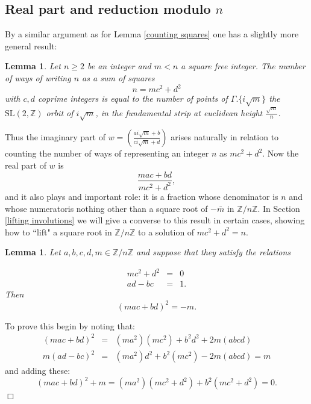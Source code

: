 \documentclass[12pt,a4paper]{amsart}
\newtheorem{lem}[thm]{Lemma}
\def\ZZ{\mathbb{Z}}
\def\sl2{\mathrm{SL}(2, \ZZ)}
\begin{document}
\subsection{Real part and reduction modulo $n$}
\label{real part}

By a similar argument as for Lemma \ref{counting squares}
one has a slightly more general result:

\begin{lem} \label{counting quadratic form}
Let $n\geq2$ be an integer and $m < n$ a square free integer.
The number of  ways of writing $n$  as a  sum of squares
$$n = mc^2 + d^2$$
with $c,d$ coprime integers
is equal to the number of points
of $\Gamma.\{i\sqrt m\}  $
the $\sl2$  orbit of $i\sqrt m$,
in the fundamental strip at euclidean height $\frac{\sqrt m}{n}$.
\end{lem}
\noindent
Thus the imaginary part of
$w = \left (\frac{ai\sqrt{m} +b}{ci\sqrt{m}+d } \right)$
arises naturally in relation to counting the number of ways of
representing an integer $n$ as $mc^2 + d^2$.
Now the real part of $w$ is
$$\frac{mac +bd}{mc^2+d^2 } ,$$
and it also plays and important role: 
it is a fraction whose denominator is $n$ and whose numeratoris nothing other than a
square root of $-\bar{m}$ in $\mathbb{Z} / n\mathbb{Z}$.
In Section \ref{lifting involutions}
we will give a converse to this result in certain cases,
showing how to ``lift" a square root in $\mathbb{Z}/n \mathbb{Z}$ to a solution of $mc^2
+ d^2 = n$.


\begin{lem}\label{square root -m}
Let $a,b,c,d,m\in \mathbb{Z} / n\mathbb{Z}$ and suppose that they satisfy
the relations

\begin{eqnarray}
	mc^2 + d^2 &=& 0\\
	ad -bc &=& 1 \label{determinant}.
\end{eqnarray}
Then
$$	(mac + bd)^2 = -m.$$

\end{lem}

\proof 

To prove this begin by noting that:
\begin{eqnarray*}
	(mac + bd)^2 &=& (ma^2)(mc^2) + b^2d^2 + 2m(abcd) \\
	m(ad-bc)^2 &=& (ma^2)d^2
	+ b^2(mc^2)  - 2m(abcd) = m
\end{eqnarray*}
and adding these:
$$
	(mac + bd)^2 + m = (ma^2)(mc^2+d^2) + b^2(mc^2 + d^2
	) = 0.
$$
\hfill $\Box$
\end{document}
